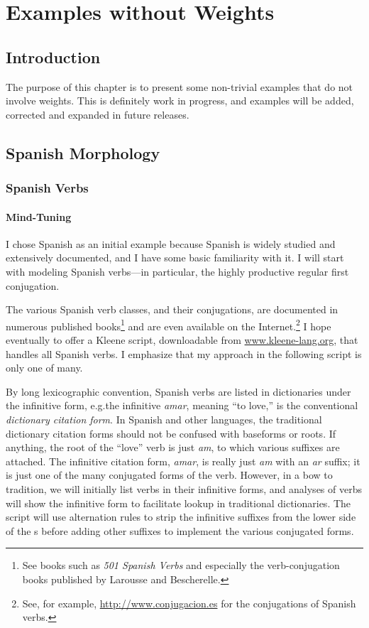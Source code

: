 \chapter{Examples without Weights}

\label{chapt:exampleswithoutweights}

\section{Introduction}

The purpose of this chapter is to present some non-trivial examples that
do not involve weights.  This is definitely work in progress, and
examples will be added, corrected and expanded in future releases.

\section{Spanish Morphology}

\subsection{Spanish Verbs}

\subsubsection{Mind-Tuning}

I chose Spanish as an initial example because Spanish is widely
studied and extensively documented, and I have some basic
familiarity with it.  I will start with modeling
Spanish verbs---in particular, the highly productive
regular first conjugation.  

The various Spanish verb classes, and
their conjugations, are documented in numerous published
books\footnote{See books such as \emph{501 Spanish Verbs} and especially the
verb-conjugation books published by Larousse and Bescherelle.} and are
even available on the Internet.\footnote{See, for example,
\url{http://www.conjugacion.es} for the conjugations of
Spanish verbs.}  I hope eventually to
offer a Kleene script, downloadable from \url{www.kleene-lang.org},
that handles all Spanish verbs.  I emphasize that my approach in the
following script is only one of many.

By long lexicographic convention, Spanish verbs are listed in
dictionaries under the infinitive form, e.g.\@ the infinitive
\emph{amar}, meaning ``to love,'' is the conventional \emph{dictionary
citation form}.  In Spanish and other languages, the traditional dictionary citation
forms should not be confused with baseforms or roots.  If anything, the
root
of the ``love'' verb is just \emph{am}, to which various suffixes
are attached.  The infinitive citation form, \emph{amar}, is really just \emph{am}
with an \emph{ar} suffix; it is just one of the many conjugated forms
of the verb.  However, in a bow to tradition, we will
initially list verbs in their infinitive forms, and analyses of verbs
will show the infinitive form to facilitate lookup in traditional
dictionaries.  The script will use alternation
rules to strip the infinitive suffixes from the lower side of the
\fsm{}s before adding other suffixes to implement the various conjugated
forms.


